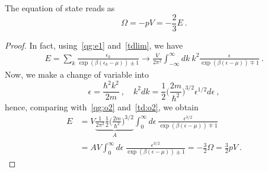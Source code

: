     The equation of state reads as 
    \begin{equation}\label{qg:e2}
        \Omega = - pV = - \frac{2}{3} E ~.
    \end{equation}
    \begin{proof}
        In fact, using~\eqref{qg:e1} and~\eqref{tdlim}, we have 
        \begin{equation*}
        \begin{aligned}
            E = \sum_k \frac{\epsilon_k}{\exp(\beta(\epsilon_k - \mu)) \pm 1} \rightarrow \frac{V}{2\pi^2} \int_{-\infty}^\infty dk~ k^2 \frac{\epsilon}{\exp(\beta(\epsilon - \mu)) \mp 1} ~.
        \end{aligned}
        \end{equation*}
        Now, we make a change of variable into
        \begin{equation*}
            \epsilon = \frac{\hbar^2 k^2}{2m} ~, \quad k^2 dk = \frac{1}{2} \Big (\frac{2m}{\hbar^2}\Big)^{3/2} \epsilon^{1/2} d\epsilon ~,
        \end{equation*}
        hence, comparing with~\eqref{qg:o2} and~\eqref{td:o2}, we obtain
        \begin{equation*}
        \begin{aligned}
            E & = V \underbrace{ \frac{1}{2\pi^2} \frac{1}{2} \Big (\frac{2m}{\hbar^2}\Big)^{3/2}}_A \int_0^\infty d\epsilon ~ \frac{\epsilon^{3/2}}{\exp(\beta(\epsilon - \mu)) \mp 1} \\ & = A V \int_0^\infty d\epsilon ~ \frac{\epsilon^{3/2}}{\exp(\beta(\epsilon - \mu)) \pm 1} = - \frac{3}{2} \Omega = \frac{3}{2} p V ~.
        \end{aligned}
        \end{equation*}
    \end{proof}

